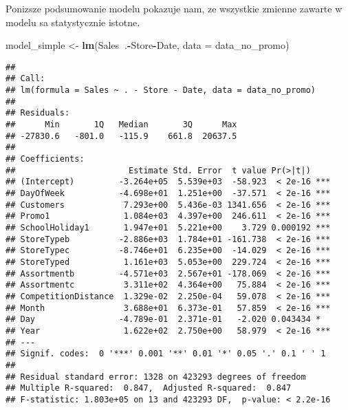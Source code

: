\documentclass[]{article}
\newenvironment{Shaded}{\begin{snugshade}}{\end{snugshade}}
\newcommand{\DataTypeTok}[1]{\textcolor[rgb]{0.13,0.29,0.53}{#1}}
\newcommand{\KeywordTok}[1]{\textcolor[rgb]{0.13,0.29,0.53}{\textbf{#1}}}
\newcommand{\NormalTok}[1]{#1}
\newcommand{\OperatorTok}[1]{\textcolor[rgb]{0.81,0.36,0.00}{\textbf{#1}}}
\newcommand{\StringTok}[1]{\textcolor[rgb]{0.31,0.60,0.02}{#1}}
\begin{document}
Ponizsze podsumowanie modelu pokazuje nam, ze wszystkie zmienne zawarte
w modelu sa statystycznie istotne.

\begin{Shaded}
\begin{Highlighting}[]
\NormalTok{model_simple <-}\StringTok{ }\KeywordTok{lm}\NormalTok{(Sales}\OperatorTok{~}\NormalTok{.}\OperatorTok{-}\NormalTok{Store}\OperatorTok{-}\NormalTok{Date, }\DataTypeTok{data =}\NormalTok{ data_no_promo)}
\end{Highlighting}
\end{Shaded}

\begin{Shaded}
\end{Shaded}

\begin{verbatim}
## 
## Call:
## lm(formula = Sales ~ . - Store - Date, data = data_no_promo)
## 
## Residuals:
##      Min       1Q   Median       3Q      Max 
## -27830.6   -801.0   -115.9    661.8  20637.5 
## 
## Coefficients:
##                       Estimate Std. Error  t value Pr(>|t|)    
## (Intercept)         -3.264e+05  5.539e+03  -58.923  < 2e-16 ***
## DayOfWeek           -4.698e+01  1.251e+00  -37.571  < 2e-16 ***
## Customers            7.293e+00  5.436e-03 1341.656  < 2e-16 ***
## Promo1               1.084e+03  4.397e+00  246.611  < 2e-16 ***
## SchoolHoliday1       1.947e+01  5.221e+00    3.729 0.000192 ***
## StoreTypeb          -2.886e+03  1.784e+01 -161.738  < 2e-16 ***
## StoreTypec          -8.746e+01  6.235e+00  -14.029  < 2e-16 ***
## StoreTyped           1.161e+03  5.053e+00  229.724  < 2e-16 ***
## Assortmentb         -4.571e+03  2.567e+01 -178.069  < 2e-16 ***
## Assortmentc          3.311e+02  4.364e+00   75.884  < 2e-16 ***
## CompetitionDistance  1.329e-02  2.250e-04   59.078  < 2e-16 ***
## Month                3.688e+01  6.373e-01   57.859  < 2e-16 ***
## Day                 -4.789e-01  2.371e-01   -2.020 0.043434 *  
## Year                 1.622e+02  2.750e+00   58.979  < 2e-16 ***
## ---
## Signif. codes:  0 '***' 0.001 '**' 0.01 '*' 0.05 '.' 0.1 ' ' 1
## 
## Residual standard error: 1328 on 423293 degrees of freedom
## Multiple R-squared:  0.847,  Adjusted R-squared:  0.847 
## F-statistic: 1.803e+05 on 13 and 423293 DF,  p-value: < 2.2e-16
\end{verbatim}
\end{document}
